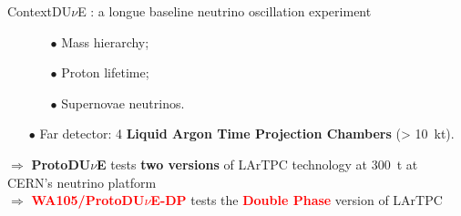 \documentclass[10pt]{beamer}
\begin{document}
\begin{frame}{Context}{DU$\nu$E : a longue baseline neutrino oscillation experiment}
\begin{scriptsize}
\begin{minipage}{0.38\textwidth}
\begin{itemize}
\begin{itemize}
	    				\item[$\bullet$] Mass hierarchy;
	    				\item[$\bullet$] Proton lifetime;
	    				\item[$\bullet$] Supernovae neutrinos.
	    			\end{itemize}
    			\item[$\bullet$] Far detector: 4 \textbf{Liquid Argon Time Projection Chambers} (> \SI{10}{\kilo\tonne}).
    		\end{itemize}
    		\vspace{.3cm}
    		$\Rightarrow$ \textbf{ProtoDU$\nu$E} tests \textbf{two versions} of LArTPC technology at \SI{300}{\tonne} at CERN's neutrino platform\\
    		
    		$\Rightarrow$ \textcolor{red}{\textbf{WA105/ProtoDU$\nu$E-DP}} tests the \textcolor{red}{\textbf{Double Phase}} version of LArTPC 
	    \end{minipage}
	\end{scriptsize}
    \end{frame}
    
\end{document}
